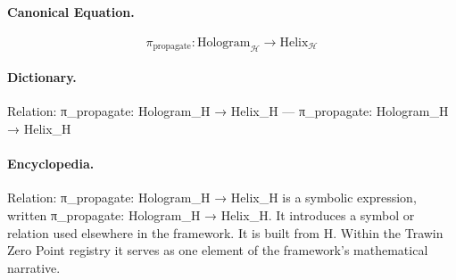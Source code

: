 \paragraph{Canonical Equation.}
\[
\pi_{\text{propagate}}: \text{Hologram}_{\mathcal{H}} \to \text{Helix}_{\mathcal{H}}
\]

\paragraph{Dictionary.}
Relation: π\_propagate: Hologram\_H → Helix\_H — π\_propagate: Hologram\_H → Helix\_H

\paragraph{Encyclopedia.}
Relation: π\_propagate: Hologram\_H → Helix\_H is a symbolic expression, written π\_propagate: Hologram\_H → Helix\_H. It introduces a symbol or relation used elsewhere in the framework. It is built from H. Within the Trawin Zero Point registry it serves as one element of the framework's mathematical narrative.
